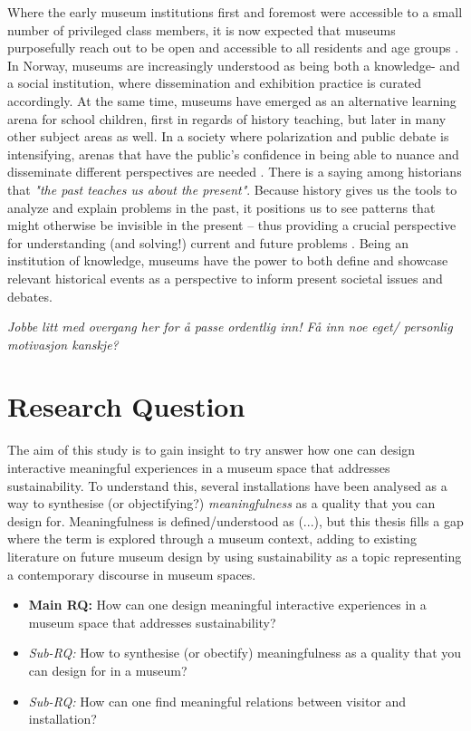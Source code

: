 Where the early museum institutions first and foremost were accessible to a small number of privileged class members, it is now expected that museums purposefully reach out to be open and accessible to all residents and age groups \autocite[p. 14]{melding23}. In Norway, museums are increasingly understood as being both a knowledge- and a social institution, where dissemination and exhibition practice is curated accordingly. At the same time, museums have emerged as an alternative learning arena for school children, first in regards of history teaching, but later in many other subject areas as well. In a society where polarization and public debate is intensifying, arenas that have the public's confidence in being able to nuance and disseminate different perspectives are needed \autocite[p. 7]{melding23}. There is a saying among historians that \emph{"the past teaches us about the present"}. Because history gives us the tools to analyze and explain problems in the past, it positions us to see patterns that might otherwise be invisible in the present – thus providing a crucial perspective for understanding (and solving!) current and future problems \autocite{UW_website}. Being an institution of knowledge, museums have the power to both define and showcase relevant historical events as a perspective to inform present societal issues and debates. 

\par
\emph{Jobbe litt med overgang her for å passe ordentlig inn! Få inn noe eget/ personlig motivasjon kanskje?}

\section{Research Question}

The aim of this study is to gain insight to try answer how one can design interactive meaningful experiences in a museum space that addresses sustainability. To understand this, several installations have been analysed as a way to synthesise (or objectifying?) \emph{meaningfulness} as a quality that you can design for. Meaningfulness is defined/understood as (...), but this thesis fills a gap where the term is explored through a museum context, adding to existing literature on future museum design by using sustainability as a topic representing a contemporary discourse in museum spaces.

\begin{itemize}
    \item \textbf{Main RQ:} How can one design meaningful interactive experiences in a museum space that addresses sustainability?
    \item \emph{Sub-RQ:} How to synthesise (or obectify) meaningfulness as a quality that you can design for in a museum?
    \item \emph{Sub-RQ:} How can one find meaningful relations between visitor and installation?
\end{itemize}



